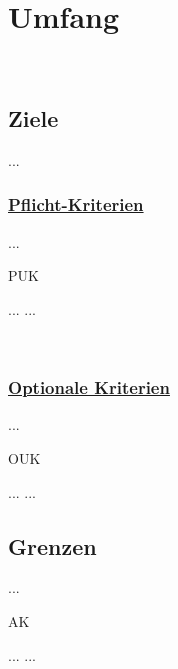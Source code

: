 %
%


\chapter{Umfang}
\label{UF}~\\


%
%
\section{Ziele}
\label{UF:Ziele}

...
\\

% 
%
\subsection*{\underline{Pflicht-Kriterien}}

...
\\

\begin{ids}{\gls{PUK}}

	\id[ 1] ...
	\id[10] ...

\end{ids}

~\\


\subsection*{\underline{Optionale Kriterien}}

...
\\

\begin{ids}{\gls{OUK}}

	\id[ 11] ...
	\id[100] ...

\end{ids}


%
%
\clearpage


\section{Grenzen}
\label{UF:Grenzen}

...
\\

\begin{ids}{\gls{AK}}

	\id[ 1] ...
	\id[10] ...

\end{ids}


